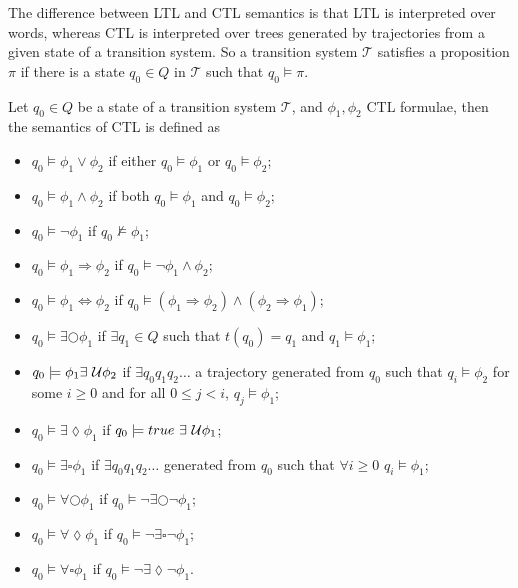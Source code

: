 The difference between LTL and CTL semantics is that LTL is interpreted over words, whereas CTL is interpreted over trees generated by trajectories from a given state of a transition system. So a transition system $\mathcal{T}$ satisfies a proposition $\pi$ if there is a state $q_{0}\in Q$ in $\mathcal{T}$ such that $q_{0}\models \pi$.
\begin{defi}
Let $q_{0}\in Q$ be a state of a transition system $\mathcal{T}$, and $\phi_{1},\phi_{2}$ CTL formulae, then the semantics of CTL is defined as
\begin{itemize}
    \item{$q_{0}\models\phi_{1}\lor\phi_{2}$ if either $q_{0}\models\phi_{1}$ or $q_{0}\models\phi_{2}$;}
    \item{$q_{0}\models\phi_{1}\land\phi_{2}$ if both $q_{0}\models\phi_{1}$ and $q_{0}\models\phi_{2}$;}
    \item{$q_{0}\models\lnot\phi_{1}$ if $q_{0}\not\models\phi_{1}$;}
    \item{$q_{0}\models\phi_{1}\Rightarrow\phi_{2}$ if $q_{0}\models\lnot\phi_{1} \land \phi_{2}$;}
    \item{$q_{0}\models\phi_{1}\Leftrightarrow\phi_{2}$ if $q_{0}\models(\phi_{1}\Rightarrow\phi_{2})\land(\phi_{2}\Rightarrow\phi_{1})$;}
    \item{$q_{0}\models\exists\bigcirc\phi_{1}$ if $\exists q_{1}\in Q$ such that
    $t(q_{0})=q_{1}$ and $q_{1}\models \phi_{1}$;}
    \item{$q_{0}\models\phi_{1}\exists\ \mathcal{U}\phi_{2}$ if $\exists q_{0}q_{1}q_{2}\ldots$ a trajectory generated from $q_{0}$ such that $q_{i}\models \phi_{2}$ for some $i\geq 0$ and for all $0\leq j < i$, $q_{j}\models \phi_{1}$;}
    \item{$q_{0}\models\exists\lozenge\phi_{1}$ if $q_{0}\models true\ \exists\ \mathcal{U} \phi_{1}$;}
    \item{$q_{0}\models\exists\square\phi_{1}$ if $\exists q_{0}q_{1}q_{2}\ldots$ generated from $q_{0}$ such that $\forall i\geq 0$ $q_{i}\models\phi_{1}$;}

    \item{$q_{0}\models\forall\bigcirc\phi_{1}$ if $q_{0}\models\lnot\exists\bigcirc\lnot\phi_{1}$;}
    \item{$q_{0}\models\forall\lozenge\phi_{1}$ if $q_{0}\models\lnot\exists\square\lnot\phi_{1}$;}
    \item{$q_{0}\models\forall\square\phi_{1}$ if $q_{0}\models\lnot\exists\lozenge\lnot\phi_{1}$.}
\end{itemize}
\end{defi}

